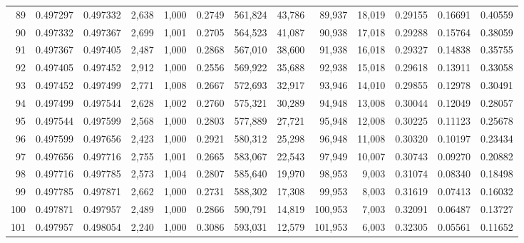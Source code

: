 \begin{tabular}{rrrrrrrrrrrrr}
89  &  0.497297 &  0.497332 &   2,638 &  1,000 &                                     0.2749 &  561,824 &   43,786 &   89,937 &   18,019 &  0.29155 &  0.16691 &  0.40559 \\
90  &  0.497332 &  0.497367 &   2,699 &  1,001 &                                     0.2705 &  564,523 &   41,087 &   90,938 &   17,018 &  0.29288 &  0.15764 &  0.38059 \\
91  &  0.497367 &  0.497405 &   2,487 &  1,000 &                                     0.2868 &  567,010 &   38,600 &   91,938 &   16,018 &  0.29327 &  0.14838 &  0.35755 \\
92  &  0.497405 &  0.497452 &   2,912 &  1,000 &                                     0.2556 &  569,922 &   35,688 &   92,938 &   15,018 &  0.29618 &  0.13911 &  0.33058 \\
93  &  0.497452 &  0.497499 &   2,771 &  1,008 &                                     0.2667 &  572,693 &   32,917 &   93,946 &   14,010 &  0.29855 &  0.12978 &  0.30491 \\
94  &  0.497499 &  0.497544 &   2,628 &  1,002 &                                     0.2760 &  575,321 &   30,289 &   94,948 &   13,008 &  0.30044 &  0.12049 &  0.28057 \\
95  &  0.497544 &  0.497599 &   2,568 &  1,000 &                                     0.2803 &  577,889 &   27,721 &   95,948 &   12,008 &  0.30225 &  0.11123 &  0.25678 \\
96  &  0.497599 &  0.497656 &   2,423 &  1,000 &                                     0.2921 &  580,312 &   25,298 &   96,948 &   11,008 &  0.30320 &  0.10197 &  0.23434 \\
97  &  0.497656 &  0.497716 &   2,755 &  1,001 &                                     0.2665 &  583,067 &   22,543 &   97,949 &   10,007 &  0.30743 &  0.09270 &  0.20882 \\
98  &  0.497716 &  0.497785 &   2,573 &  1,004 &                                     0.2807 &  585,640 &   19,970 &   98,953 &    9,003 &  0.31074 &  0.08340 &  0.18498 \\
99  &  0.497785 &  0.497871 &   2,662 &  1,000 &                                     0.2731 &  588,302 &   17,308 &   99,953 &    8,003 &  0.31619 &  0.07413 &  0.16032 \\
100 &  0.497871 &  0.497957 &   2,489 &  1,000 &                                     0.2866 &  590,791 &   14,819 &  100,953 &    7,003 &  0.32091 &  0.06487 &  0.13727 \\
101 &  0.497957 &  0.498054 &   2,240 &  1,000 &                                     0.3086 &  593,031 &   12,579 &  101,953 &    6,003 &  0.32305 &  0.05561 &  0.11652 \\

\end{tabular}
